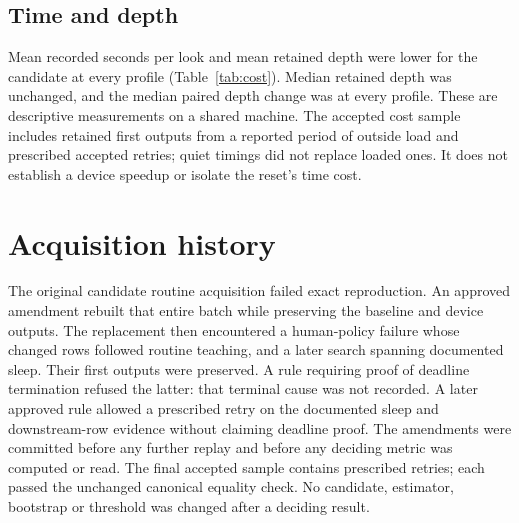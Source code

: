 \documentclass[11pt]{article}
\begin{document}
\begin{table}[ht]
\centering\QualityTable
\caption{Disagreement with the fixed higher-budget reference on common
attempted looks. The guard is inconclusive at every profile.}
\label{tab:quality}
\end{table}

\subsection{Time and depth}
Mean recorded seconds per look and mean retained depth were lower for the
candidate at every profile (Table~\ref{tab:cost}). Median retained depth was
unchanged, and the median paired depth change was \PairedDepthMedian{} at every profile.
These are descriptive measurements on a shared machine. The accepted cost
sample includes retained first outputs from a reported period of outside
load and prescribed accepted retries; quiet timings did not replace loaded
ones. It does not establish a device speedup or isolate the reset's time cost.

\begin{table}[ht]
\centering\CostTable
\caption{Accepted observed replays, including initial and adaptive searches.
Depth is retained before teaching. These are Node profile measurements.}
\label{tab:cost}
\end{table}

\section{Acquisition history}
The original candidate routine acquisition failed exact reproduction. An
approved amendment rebuilt that entire batch while preserving the baseline
and device outputs. The replacement then encountered a human-policy failure
whose changed rows followed routine teaching, and a later search spanning
documented sleep. Their first outputs were preserved. A rule requiring proof
of deadline termination refused the latter: that terminal cause was not
recorded. A later approved rule allowed a prescribed retry on the documented
sleep and downstream-row evidence without claiming deadline proof.
The \Amendments{} amendments were committed before any further replay and
before any deciding metric was computed or read. The final accepted sample
contains \AcceptedRetries{} prescribed retries; each passed the unchanged
canonical equality check. No candidate, estimator, bootstrap or threshold
was changed after a deciding result.
\end{document}
